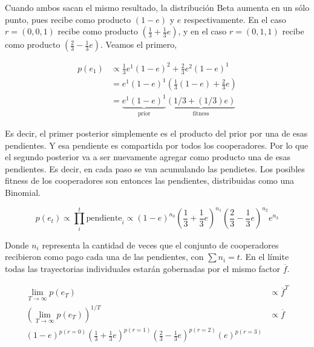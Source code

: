 \documentclass[a4paper,10pt]{article}
\begin{document}
Cuando ambos sacan el mismo resultado, la distribución Beta aumenta en un sólo punto, pues recibe como producto $(1-e)$ y $e$ respectivamente.
En el caso $r = (0,0,1)$ recibe como producto $(\frac{1}{3} + \frac{1}{3}e )$, y en el caso $r = (0,1,1)$ recibe como producto $(\frac{2}{3} - \frac{1}{3}e )$.
Veamos el primero,

\begin{equation}
\begin{split}
p(e_1) & \propto \frac{1}{3} e^1 (1-e)^2 + \frac{2}{3} e^2 (1-e)^1  \\
& =  e^1 (1-e)^1 ( \frac{1}{3} (1-e) +  \frac{2}{3} e)  \\
& =  \underbrace{e^1 (1-e)^1}_{\text{prior}} \underbrace{(1/3 + (1/3)e )}_{\text{fitness}}
\end{split}
\end{equation}

Es decir, el primer posterior simplemente es el producto del prior por una de esas pendientes.
Y esa pendiente es compartida por todos los cooperadores.
Por lo que el segundo posterior va a ser nuevamente agregar como producto una de esas pendientes.
Es decir, en cada paso se van acumulando las pendietes.
Los posibles fitness de los cooperadores son entonces las pendientes, distribuidas como una Binomial. 


\begin{equation}
p(e_t) \propto \prod_i^t \text{pendiente}_i \propto (1-e)^{n_0} (\frac{1}{3} + \frac{1}{3}e )^{n_1} (\frac{2}{3} - \frac{1}{3}e )^{n_2} e^{n_3}
\end{equation}

Donde $n_i$ representa la cantidad de veces que el conjunto de cooperadores recibieron como pago cada una de las pendientes, con $\sum n_i = t$.
En el límite todas las trayectorias individuales estarán gobernadas por el mismo factor $\overline{f}$.

\begin{equation}
\begin{split}
\lim_{T \rightarrow \infty} p(e_T) & \propto \overline{f}^T \\
(\lim_{T \rightarrow \infty} p(e_T) )^{1/T} & \propto \overline{f} \\
(1-e)^{p(r=0)} (\frac{1}{3} + \frac{1}{3}e )^{p(r=1)} (\frac{2}{3} - \frac{1}{3}e )^{p(r=2)} (e)^{p(r=3)} & 
\end{split}
\end{equation}


\vspace{0.3cm}
\end{document}
